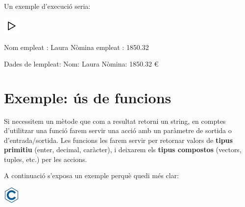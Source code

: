 \documentclass[
]{book}
\newenvironment{Shaded}{\begin{snugshade}}{\end{snugshade}}
\newcommand{\FloatTok}[1]{\textcolor[rgb]{0.00,0.00,0.81}{#1}}
\newcommand{\NormalTok}[1]{#1}
\begin{document}
Un exemple d'execució seria:

\includegraphics{./img/play.png}

\begin{Shaded}
\begin{Highlighting}[]
\NormalTok{Nom empleat : Laura}
\NormalTok{Nòmina empleat : }\FloatTok{1850.32}

\NormalTok{Dades de l\textquotesingle{}empleat: }
\NormalTok{    Nom: Laura}
\NormalTok{    Nòmina: }\FloatTok{1850.32}\NormalTok{ €}
\end{Highlighting}
\end{Shaded}

\hypertarget{exemple-uxfas-de-funcions}{%
\section{Exemple: ús de funcions}\label{exemple-uxfas-de-funcions}}

Si necessitem un mètode que com a resultat retorni un string, en comptes d'utilitzar una funció farem servir una acció amb un paràmetre de sortida o d'entrada/sortida. Les funcions les farem servir per retornar valors de \textbf{tipus primitiu} (enter, decimal, caràcter), i deixarem els \textbf{tipus compostos} (vectors, tuples, etc.) per les accions.

A continuació s'exposa un exemple perquè quedi més clar:

\includegraphics{./img/c.png}
\end{document}
